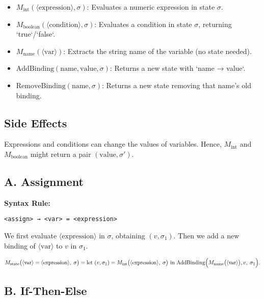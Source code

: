 \documentclass[12pt]{article}
\begin{document}
    \begin{itemize}
        \item \(\displaystyle M_{\text{int}}(\langle \text{expression} \rangle, \sigma)\): Evaluates a numeric expression in state \(\sigma\).
        \item \(\displaystyle M_{\text{boolean}}(\langle \text{condition} \rangle, \sigma)\): Evaluates a condition in state \(\sigma\), returning `true`/`false`.
        \item \(\displaystyle M_{\text{name}}(\langle \text{var}\rangle)\): Extracts the string name of the variable (no state needed).
        \item \(\text{AddBinding}(\text{name}, \text{value}, \sigma)\): Returns a new state with `name → value`.
        \item \(\text{RemoveBinding}(\text{name}, \sigma)\): Returns a new state removing that name’s old binding.
    \end{itemize}

    \subsection*{Side Effects}

    Expressions and conditions can change the values of variables. Hence, \(M_{\text{int}}\) and \(M_{\text{boolean}}\) might return a pair \((\text{value}, \sigma')\).

    \subsection*{A. Assignment}

    \textbf{Syntax Rule:}
    \begin{verbatim}
<assign> → <var> = <expression>
    \end{verbatim}

    We first evaluate \(\langle \text{expression}\rangle\) in \(\sigma\), obtaining \((v,\sigma_1)\). Then we add a new binding of \(\langle \text{var}\rangle\) to \(v\) in \(\sigma_1\).

    \[
        M_{\text{state}}\bigl(\langle \text{var}\rangle = \langle \text{expression}\rangle,\;\sigma\bigr)
        = \text{let } (v,\sigma_1) = M_{\text{int}}\bigl(\langle \text{expression}\rangle,\;\sigma\bigr)
        \text{ in }
        \text{AddBinding}\Bigl(
        M_{\text{name}}\bigl(\langle \text{var}\rangle\bigr),
        v,\;\sigma_1
        \Bigr).
    \]

    \subsection*{B. If-Then-Else}
\end{document}
